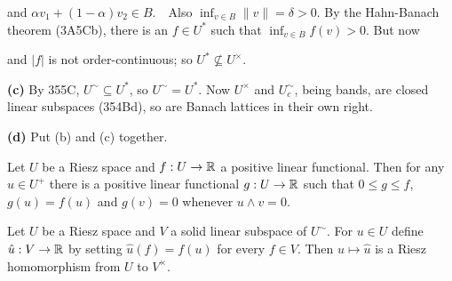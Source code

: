 {

\noindent and $\alpha v_1+(1-\alpha)v_2\in B$.\ \QeD\  Also
$\inf_{v\in B}\|v\|=\delta>0$.   By the Hahn-Banach theorem (3A5Cb), there is an
$f\in U^*$ such that $\inf_{v\in B}f(v)>0$.   But now


\noindent and $|f|$ is not order-continuous;  so $U^*\not\subseteq
U^{\times}$.

\medskip

{\bf (c)}  By 355C, $U^{\sim}\subseteq U^*$, so $U^{\sim}=U^*$.   Now
$U^{\times}$ and $U^{\sim}_c$, being bands, are closed linear subspaces
(354Bd), so are Banach lattices in their own right.

\medskip

{\bf (d)} Put (b) and (c) together.
}%


 Let $U$ be a Riesz space and $f:U\to\Bbb R$ a
positive
linear functional.   Then for any $u\in U^+$ there is a positive linear
functional $g:U\to\Bbb R$ such that $0\le g\le f$, $g(u)=f(u)$ and
$g(v)=0$ whenever $u\wedge v=0$.


 Let $U$ be a Riesz space and $V$ a solid linear
subspace of $U^{\sim}$.   For $u\in U$ define $\hat u:V\to\Bbb R$ by
setting $\hat u(f)=f(u)$ for every $f\in V$.   Then $u\mapsto\hat u$ is
a Riesz homomorphism from $U$ to $V^{\times}$.

